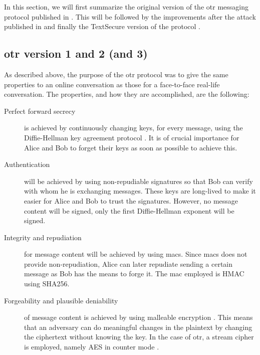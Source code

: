 \documentclass[draft]{llncs}
\begin{document}
In this section, we will first summarize the original version of the \ac{otr} 
messaging protocol published in \cite{otr2004}.
This will be followed by the improvements after the attack published in 
\cite{di2005secure} and finally the TextSecure version of the protocol 
\cite{frosch2014secure}.

\subsection{\acs{otr} version 1 and 2 (and 3)}

As described above, the purpose of the \ac{otr} protocol was to give the same 
properties to an online conversation as those for a face-to-face real-life 
conversation.
The properties, and how they are accomplished, are the following:
\begin{description}
  \item[Perfect forward secrecy] is achieved by continuously changing keys, for 
    every message, using the Diffie-Hellman key agreement protocol \cite{dh}.
    It is of crucial importance for Alice and Bob to forget their keys as soon 
    as possible to achieve this.

  \item[Authentication] will be achieved by using non-repudiable signatures so 
    that Bob can verify with whom he is exchanging messages.
    These keys are long-lived to make it easier for Alice and Bob to trust the 
    signatures.
    However, no message content will be signed, only the first Diffie-Hellman 
    exponent will be signed.

  \item[Integrity and repudiation] for message content will be achieved by 
    using \acp{mac}.
    Since \acp{mac} does not provide non-repudiation, Alice can later repudiate 
    sending a certain message as Bob has the means to forge it.
    The \ac{mac} employed is HMAC using SHA256.

  \item[Forgeability and plausible deniability] of message content is achieved 
    by using malleable encryption \cite{nonmalleable}.
    This means that an adversary can do meaningful changes in the plaintext by 
    changing the ciphertext without knowing the key.
    In the case of \ac{otr}, a stream cipher is employed, namely AES \cite{aes} 
    in counter mode \cite{blockmodes}.
\end{description}
\end{document}
